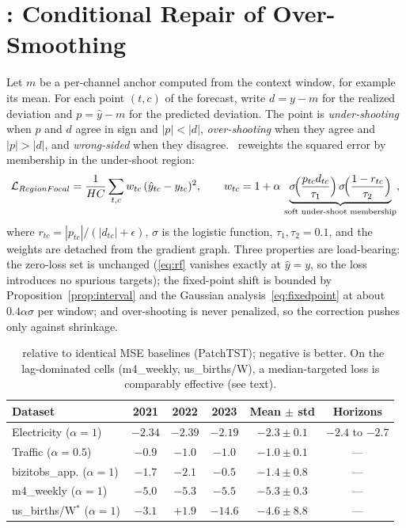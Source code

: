 \section{\rfc: Conditional Repair of Over-Smoothing}
\label{sec:regionfocal}

Let $m$ be a per-channel anchor computed from the context window, for example its mean. For each point $(t, c)$ of the forecast, write $d = y - m$ for the realized deviation and $p = \hat{y} - m$ for the predicted deviation. The point is \emph{under-shooting} when $p$ and $d$ agree in sign and $|p| < |d|$, \emph{over-shooting} when they agree and $|p| > |d|$, and \emph{wrong-sided} when they disagree. \rfc~reweights the squared error by membership in the under-shoot region:
\begin{equation}
    \mathcal{L}_{RegionFocal} = \frac{1}{HC}\sum_{t,c} w_{tc}\,(\hat{y}_{tc} - y_{tc})^2,
    \qquad
    w_{tc} = 1 + \alpha\,\underbrace{\sigma\!\Big(\frac{p_{tc} d_{tc}}{\tau_1}\Big)\,\sigma\!\Big(\frac{1 - r_{tc}}{\tau_2}\Big)}_{\text{soft under-shoot membership}},
    \label{eq:rf}
\end{equation}
where $r_{tc} = |p_{tc}| / (|d_{tc}| + \epsilon)$, $\sigma$ is the logistic function, $\tau_1, \tau_2 = 0.1$, and the weights are detached from the gradient graph. Three properties are load-bearing: the zero-loss set is unchanged (\eqref{eq:rf} vanishes exactly at $\hat{y} = y$, so the loss introduces no spurious targets); the fixed-point shift is bounded by Proposition~\ref{prop:interval} and the Gaussian analysis~\eqref{eq:fixedpoint} at about $0.4\alpha\sigma$ per window; and over-shooting is never penalized, so the correction pushes only against shrinkage.

\begin{table}[t]
  \scriptsize
  \caption{\rfc~relative to identical MSE baselines (PatchTST); negative is better. On the lag-dominated cells (m4\_weekly, us\_births/W), a median-targeted loss is comparably effective (see text).}
  \label{tab:main}
  \centering
  \begin{tabular}{lccccc}
    \toprule
    Dataset & 2021 & 2022 & 2023 & Mean $\pm$ std & Horizons \\
    \midrule
    Electricity ($\alpha{=}1$) & $-2.34$ & $-2.39$ & $-2.19$ & $-2.3 \pm 0.1$ & $-2.4$ to $-2.7$ \\
    Traffic ($\alpha{=}0.5$) & $-0.9$ & $-1.0$ & $-1.0$ & $-1.0 \pm 0.1$ & --- \\
    bizitobs\_app. ($\alpha{=}1$) & $-1.7$ & $-2.1$ & $-0.5$ & $-1.4 \pm 0.8$ & --- \\
    m4\_weekly ($\alpha{=}1$) & $-5.0$ & $-5.3$ & $-5.5$ & $-5.3 \pm 0.3$ & --- \\
    us\_births/W$^\ast$ ($\alpha{=}1$) & $-3.1$ & $+1.9$ & $-14.6$ & $-4.6 \pm 8.8$ & --- \\
    \bottomrule
  \end{tabular}
\end{table}

